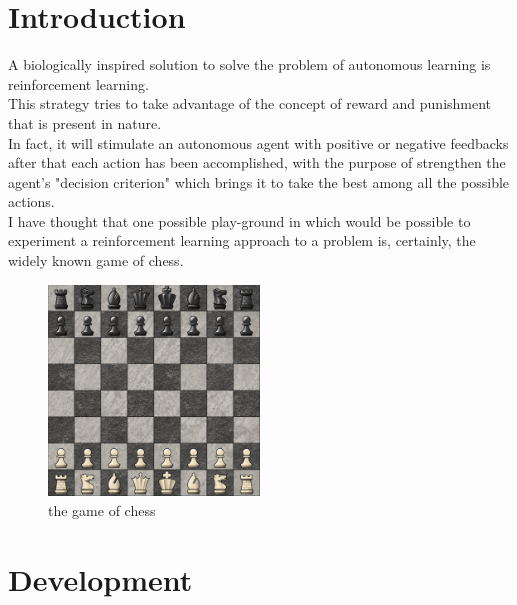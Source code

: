 \documentclass{article}
\begin{document}
			\renewcommand{\lstlistingname}{Code}

			
			\part{Introduction}


			A biologically inspired solution to solve the problem of autonomous learning is reinforcement learning.\medskip\\
			This strategy tries to take advantage of the concept of reward and punishment that is present in nature.\medskip\\
			In fact, it will stimulate an autonomous agent with positive or negative feedbacks after that each action has been accomplished, with the purpose of strengthen the agent's "decision criterion" which brings it to take the best among all the possible actions.\medskip\\
			I have thought that one possible play-ground in which would be possible to experiment a reinforcement learning approach to a problem is, certainly, the widely known game of chess.\medskip\\

\begin{center}	
\begin{figure}
\centering
\includegraphics[width=0.5\textwidth]{chess_general}
\caption{the game of chess}
\label{fig:1}
\end{figure}
\end{center}
			

				\newpage
				\part{Development}
\end{document}

